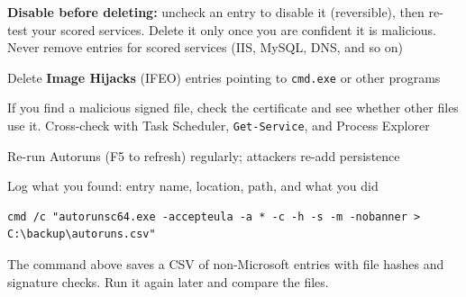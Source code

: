 \documentclass[11pt]{article}
\newcommand{\cmd}[1]{\texttt{\small #1}}
\begin{document}
\begin{mycheck}
  \item \textbf{Disable before deleting:} uncheck an entry to disable it (reversible), then re-test your scored services. Delete it only once you are confident it is malicious. Never remove entries for scored services (IIS, MySQL, DNS, and so on)
  \item Delete \textbf{Image Hijacks} (IFEO) entries pointing to \cmd{cmd.exe} or other programs
  \item If you find a malicious signed file, check the certificate and see whether other files use it. Cross-check with Task Scheduler, \cmd{Get-Service}, and Process Explorer
  \item Re-run Autoruns (F5 to refresh) regularly; attackers re-add persistence
  \item Log what you found: entry name, location, path, and what you did
\end{mycheck}
{\footnotesize
\begin{verbatim}
cmd /c "autorunsc64.exe -accepteula -a * -c -h -s -m -nobanner > C:\backup\autoruns.csv"
\end{verbatim}
}
\noindent The command above saves a CSV of non-Microsoft entries with file hashes and signature checks. Run it again later and compare the files.
\end{document}
